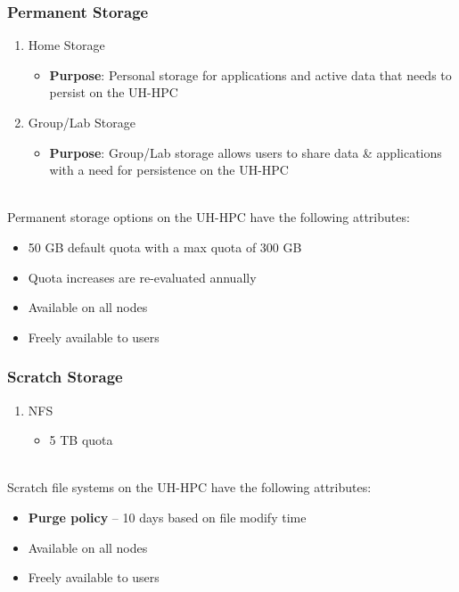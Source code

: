 \begin{frame}
  \frametitle{Permanent Storage}
  \begin{enumerate}
  \item Home Storage
    \begin{itemize}
    \item {\textbf{Purpose}}: Personal storage for applications and active data that needs to persist on the UH-HPC
    \end{itemize}
  \item Group/Lab Storage
    \begin{itemize}
    \item {\textbf{Purpose}}: Group/Lab storage allows users to share data \& applications with a need for persistence on the UH-HPC
    \end{itemize}
  \end{enumerate}
~\\
  Permanent storage options on the UH-HPC have the following attributes:
  \begin{itemize}
  \item 50 GB default quota with a max quota of 300 GB
  \item Quota increases are re-evaluated annually
  \item Available on all nodes
  \item Freely available to users
  \end{itemize}

\end{frame}


\begin{frame}
  \frametitle{Scratch Storage}
  \begin{enumerate}
    \item NFS
      \begin{itemize}
      \item 5 TB quota
      \end{itemize}
  \end{enumerate}
~\\
  Scratch file systems on the UH-HPC have the following attributes:
  \begin{itemize}
  \item \textbf{Purge policy} -- 10 days based on file modify time
  \item Available on all nodes
  \item Freely available to users
  \end{itemize}

\end{frame}




